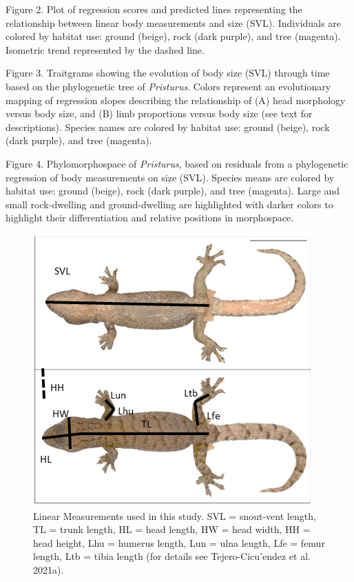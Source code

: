 \documentclass[
  11pt,
]{article}
\begin{document}
Figure 2. Plot of regression scores and predicted lines representing the
relationship between linear body measurements and size (SVL).
Individuals are colored by habitat use: ground (beige), rock (dark
purple), and tree (magenta). Isometric trend represented by the dashed
line. \hfill\break

Figure 3. Traitgrams showing the evolution of body size (SVL) through
time based on the phylogenetic tree of \emph{Pristurus}. Colors
represent an evolutionary mapping of regression slopes describing the
relationship of (A) head morphology versus body size, and (B) limb
proportions versus body size (see text for descriptions). Species names
are colored by habitat use: ground (beige), rock (dark purple), and tree
(magenta). \hfill\break

Figure 4. Phylomorphospace of \emph{Pristurus}, based on residuals from
a phylogenetic regression of body measurements on size (SVL). Species
means are colored by habitat use: ground (beige), rock (dark purple),
and tree (magenta). Large and small rock-dwelling and ground-dwelling
are highlighted with darker colors to highlight their differentiation
and relative positions in morphospace.

\newpage

\begin{figure}

{\centering \includegraphics[width=1\linewidth]{Figs/Fig1} 

}

\caption{Linear Measurements used in this study. SVL = snout-vent length, TL = trunk length, HL = head length, HW = head width, HH = head height, Lhu = humerus length, Lun = ulna length, Lfe = femur length, Ltb = tibia length (for details see Tejero-Cicu{'{e}}ndez et al. 2021a).}\label{fig:unnamed-chunk-3}
\end{figure}
\end{document}
